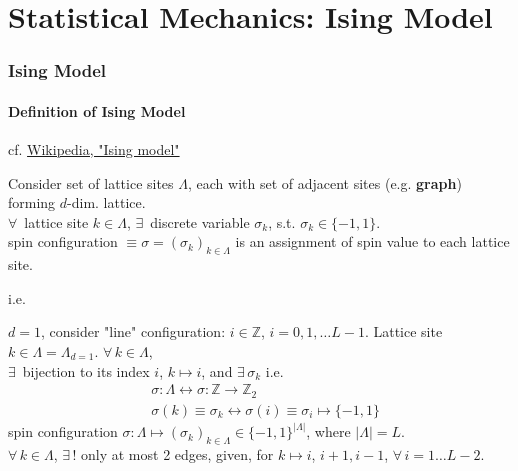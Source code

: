 \part{Statistical Mechanics: Ising Model}
  

\section{Ising Model}  

\subsection{Definition of Ising Model}  

cf. \href{https://en.wikipedia.org/wiki/Ising_model}{Wikipedia, "Ising model"}

Consider set of lattice sites $\Lambda$, each with set of adjacent sites (e.g. \textbf{graph}) forming $d$-dim. lattice.  \\
$\forall \, $ lattice site $k\in \Lambda$, $\exists \, $ discrete variable $\sigma_k$, s.t. $\sigma_k \in \lbrace -1, 1\rbrace$.  \\
spin configuration $\equiv \sigma = (\sigma_k)_{k\in \Lambda}$ is an assignment of spin value to each lattice site.  

i.e. 

$d=1$, consider "line" configuration: $i \in \mathbb{Z}$, $i=0,1,\dots L-1$.  Lattice site $k \in \Lambda = \Lambda_{d=1}$.  $\forall \, k \in \Lambda$, \\ 
$\exists \, $ bijection to its index $i$, $k\mapsto i$, and $\exists \, \sigma_k$ i.e. 
\[
\begin{aligned}
	& \sigma : \Lambda \leftrightarrow \sigma: \mathbb{Z} \to \mathbb{Z}_2 \\ 
	& \sigma(k) \equiv \sigma_k \leftrightarrow \sigma(i) \equiv \sigma_i \mapsto \lbrace -1, 1 \rbrace
\end{aligned}
\]
spin configuration $\sigma : \Lambda \mapsto (\sigma_k)_{k\in \Lambda} \in \lbrace -1,1 \rbrace^{| \Lambda |}$, where $|\Lambda | =L$.  \\
$\forall \, k \in \Lambda$, $\exists \, ! $ only at most 2 edges, given, for $k\mapsto i$, $i+1,i-1$, $\forall \, i = 1 \dots L-2$.  

